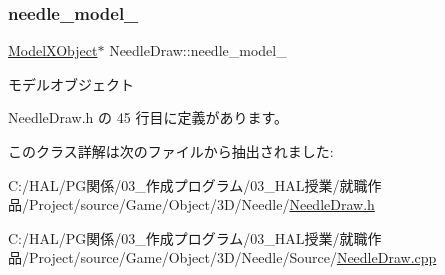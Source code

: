 \mbox{\label{class_needle_draw_ad6f458e91c2629526af29fa34a429f01}} 
\subsubsection{\texorpdfstring{needle\+\_\+model\+\_\+}{needle\_model\_}}
{\footnotesize\ttfamily \mbox{\hyperlink{class_model_x_object}{Model\+X\+Object}}$\ast$ Needle\+Draw\+::needle\+\_\+model\+\_\+\hspace{0.3cm}{\ttfamily [private]}}



モデルオブジェクト 



 Needle\+Draw.\+h の 45 行目に定義があります。



このクラス詳解は次のファイルから抽出されました\+:\begin{DoxyCompactItemize}
\item 
C\+:/\+H\+A\+L/\+P\+G関係/03\+\_\+作成プログラム/03\+\_\+\+H\+A\+L授業/就職作品/\+Project/source/\+Game/\+Object/3\+D/\+Needle/\mbox{\hyperlink{_needle_draw_8h}{Needle\+Draw.\+h}}\item 
C\+:/\+H\+A\+L/\+P\+G関係/03\+\_\+作成プログラム/03\+\_\+\+H\+A\+L授業/就職作品/\+Project/source/\+Game/\+Object/3\+D/\+Needle/\+Source/\mbox{\hyperlink{_needle_draw_8cpp}{Needle\+Draw.\+cpp}}\end{DoxyCompactItemize}
